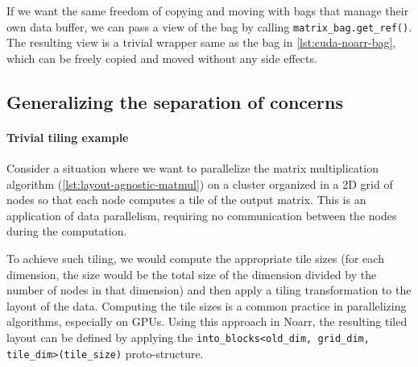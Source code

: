 If we want the same freedom of copying and moving with bags that manage their own data buffer, we can pass a view of the bag by calling \lstinline{matrix_bag.get_ref()}. The resulting view is a trivial wrapper same as the bag in \cref{lst:cuda-noarr-bag}, which can be freely copied and moved without any side effects.


\subsection{Generalizing the separation of concerns}\label{sec:generalizing-separation-of-concerns}


\paragraph*{Trivial tiling example}
Consider a situation where we want to parallelize the matrix multiplication algorithm (\cref{lst:layout-agnostic-matmul}) on a cluster organized in a 2D grid of nodes so that each node computes a tile of the output matrix.
This is an application of data parallelism, requiring no communication between the nodes during the computation.


To achieve such tiling, we would compute the appropriate tile sizes (for each dimension, the size would be the total size of the dimension divided by the number of nodes in that dimension) and then apply a tiling transformation to the layout of the data. Computing the tile sizes is a common practice in parallelizing algorithms, especially on GPUs. Using this approach in Noarr, the resulting tiled layout can be defined by applying the \lstinline{into_blocks<old_dim, grid_dim, tile_dim>(tile_size)} proto-structure.


